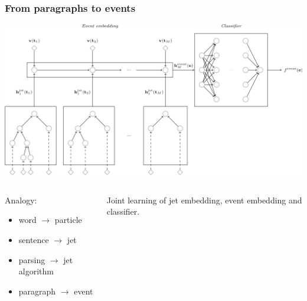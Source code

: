 \documentclass{beamer}
\begin{document}
\begin{frame}
    \frametitle{From paragraphs to events}

    \begin{center}
        \includegraphics[width=\textwidth]{figures/event-rnn.png}
    \end{center}


    \begin{columns}
        \begin{column}{0.5\textwidth}
            Analogy:
            \begin{itemize}
                \item word $\rightarrow$ particle
                \item sentence $\rightarrow$ jet
                \item parsing $\rightarrow$ jet algorithm
                \item paragraph $\rightarrow$ event
            \end{itemize}
        \end{column}
        \begin{column}{0.5\textwidth}
            \centering
            {\color{red}Joint learning of jet embedding, event embedding and classifier.}
        \end{column}
    \end{columns}


\end{frame}
\end{document}
